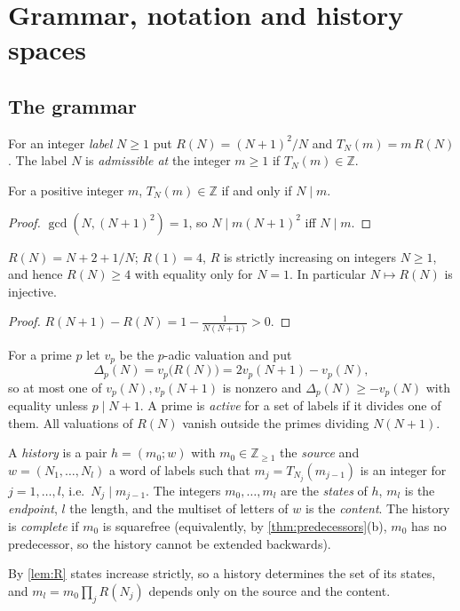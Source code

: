 \section{Grammar, notation and history spaces}\label{sec:grammar}
\subsection{The grammar}
\begin{definition}[SELECT-II]\label{def:select}
For an integer \emph{label} $N\ge1$ put $R(N)=(N+1)^2/N$ and $T_N(m)=m\,R(N)$. The label $N$ is \emph{admissible at} the integer $m\ge1$ if $T_N(m)\in\mathbb Z$.
\end{definition}
\begin{lemma}\label{lem:adm}
For a positive integer $m$, $T_N(m)\in\mathbb Z$ if and only if $N\mid m$.
\end{lemma}
\begin{proof}
$\gcd(N,(N+1)^2)=1$, so $N\mid m(N+1)^2$ iff $N\mid m$.
\end{proof}
\begin{lemma}[multipliers]\label{lem:R}
$R(N)=N+2+1/N$; $R(1)=4$, $R$ is strictly increasing on integers $N\ge1$, and hence $R(N)\ge4$ with equality only for $N=1$. In particular $N\mapsto R(N)$ is injective.
\end{lemma}
\begin{proof}
$R(N+1)-R(N)=1-\frac1{N(N+1)}>0$.
\end{proof}
For a prime $p$ let $v_p$ be the $p$-adic valuation and put
\[
 \Delta_p(N)=v_p\bigl(R(N)\bigr)=2v_p(N+1)-v_p(N),
\]
so at most one of $v_p(N),v_p(N+1)$ is nonzero and $\Delta_p(N)\ge-v_p(N)$ with equality unless $p\mid N+1$. A prime is \emph{active} for a set of labels if it divides one of them. All valuations of $R(N)$ vanish outside the primes dividing $N(N+1)$.

\begin{definition}[history]\label{def:history}
A \emph{history} is a pair $h=(m_0;w)$ with $m_0\in\mathbb Z_{\ge1}$ the \emph{source} and $w=(N_1,\dots,N_l)$ a word of labels such that $m_j=T_{N_j}(m_{j-1})$ is an integer for $j=1,\dots,l$, i.e.\ $N_j\mid m_{j-1}$. The integers $m_0,\dots,m_l$ are the \emph{states} of $h$, $m_l$ is the \emph{endpoint}, $l$ the length, and the multiset of letters of $w$ is the \emph{content}. The history is \emph{complete} if $m_0$ is squarefree (equivalently, by \cref{thm:predecessors}(b), $m_0$ has no predecessor, so the history cannot be extended backwards).
\end{definition}
By \cref{lem:R} states increase strictly, so a history determines the set of its states, and $m_l=m_0\prod_j R(N_j)$ depends only on the source and the content.

